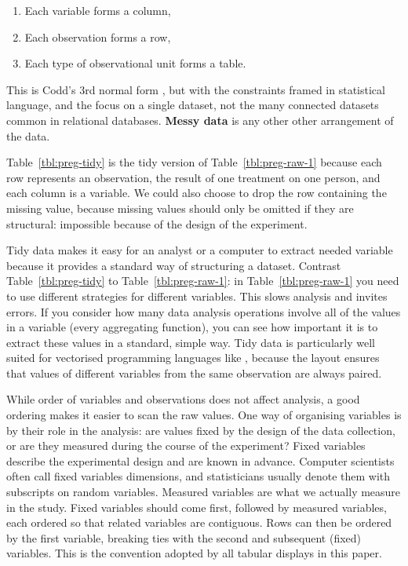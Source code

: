 \documentclass[article]{jss}
\begin{document}
\begin{enumerate}
  \item Each variable forms a column,
  \item Each observation forms a row,
  \item Each type of observational unit forms a table.
\end{enumerate}

\noindent This is Codd's 3rd normal form \citep{codd:1990}, but with the constraints framed in statistical language, and the focus on a single dataset, not the many connected datasets common in relational databases. \textbf{Messy data} is any other other arrangement of the data. 

Table~\ref{tbl:preg-tidy} is the tidy version of Table~\ref{tbl:preg-raw-1} because each row represents an observation, the result of one treatment on one person, and each column is a variable. We could also choose to drop the row containing the missing value, because missing values should only be omitted if they are structural: impossible because of the design of the experiment.

Tidy data makes it easy for an analyst or a computer to extract needed variable because it provides a standard way of structuring a dataset. Contrast Table~\ref{tbl:preg-tidy} to Table~\ref{tbl:preg-raw-1}: in Table~\ref{tbl:preg-raw-1} you need to use different strategies for different variables. This slows analysis and invites errors. If you consider how many data analysis operations involve all of the values in a variable (every aggregating function), you can see how important it is to extract these values in a standard, simple way. Tidy data is particularly well suited for vectorised programming languages like , because the layout ensures that values of different variables from the same observation are always paired.

While order of variables and observations does not affect analysis, a good ordering makes it easier to scan the raw values. One way of organising variables is by their role in the analysis: are values fixed by the design of the data collection, or are they measured during the course of the experiment? Fixed variables describe the experimental design and are known in advance. Computer scientists often call fixed variables dimensions, and statisticians usually denote them with subscripts on random variables. Measured variables are what we actually measure in the study. Fixed variables should come first, followed by measured variables, each ordered so that related variables are contiguous. Rows can then be ordered by the first variable, breaking ties with the second and subsequent (fixed) variables. This is the convention adopted by all tabular displays in this paper. 
\end{document}
